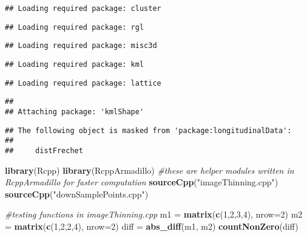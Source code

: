 \documentclass[
]{article}
\newenvironment{Shaded}{\begin{snugshade}}{\end{snugshade}}
\newcommand{\CommentTok}[1]{\textcolor[rgb]{0.56,0.35,0.01}{\textit{#1}}}
\newcommand{\DataTypeTok}[1]{\textcolor[rgb]{0.13,0.29,0.53}{#1}}
\newcommand{\DecValTok}[1]{\textcolor[rgb]{0.00,0.00,0.81}{#1}}
\newcommand{\KeywordTok}[1]{\textcolor[rgb]{0.13,0.29,0.53}{\textbf{#1}}}
\newcommand{\NormalTok}[1]{#1}
\newcommand{\StringTok}[1]{\textcolor[rgb]{0.31,0.60,0.02}{#1}}
\begin{document}
\begin{verbatim}
## Loading required package: cluster
\end{verbatim}

\begin{verbatim}
## Loading required package: rgl
\end{verbatim}

\begin{verbatim}
## Loading required package: misc3d
\end{verbatim}

\begin{verbatim}
## Loading required package: kml
\end{verbatim}

\begin{verbatim}
## Loading required package: lattice
\end{verbatim}

\begin{verbatim}
## 
## Attaching package: 'kmlShape'
\end{verbatim}

\begin{verbatim}
## The following object is masked from 'package:longitudinalData':
## 
##     distFrechet
\end{verbatim}

\begin{Shaded}
\begin{Highlighting}[]
\KeywordTok{library}\NormalTok{(Rcpp)}
\KeywordTok{library}\NormalTok{(RcppArmadillo)}
\CommentTok{#these are helper modules written in RcppArmadillo for faster computation}
\KeywordTok{sourceCpp}\NormalTok{(}\StringTok{"imageThinning.cpp"}\NormalTok{)}
\KeywordTok{sourceCpp}\NormalTok{(}\StringTok{"downSamplePoints.cpp"}\NormalTok{)}
\end{Highlighting}
\end{Shaded}

\begin{Shaded}
\begin{Highlighting}[]
\CommentTok{#testing functions in imageThinning.cpp}
\NormalTok{m1 =}\StringTok{ }\KeywordTok{matrix}\NormalTok{(}\KeywordTok{c}\NormalTok{(}\DecValTok{1}\NormalTok{,}\DecValTok{2}\NormalTok{,}\DecValTok{3}\NormalTok{,}\DecValTok{4}\NormalTok{), }\DataTypeTok{nrow=}\DecValTok{2}\NormalTok{)}
\NormalTok{m2 =}\StringTok{ }\KeywordTok{matrix}\NormalTok{(}\KeywordTok{c}\NormalTok{(}\DecValTok{1}\NormalTok{,}\DecValTok{2}\NormalTok{,}\DecValTok{2}\NormalTok{,}\DecValTok{4}\NormalTok{), }\DataTypeTok{nrow=}\DecValTok{2}\NormalTok{)}
\NormalTok{diff =}\StringTok{ }\KeywordTok{abs_diff}\NormalTok{(m1, m2)}
\KeywordTok{countNonZero}\NormalTok{(diff)}
\end{Highlighting}
\end{Shaded}
\end{document}
